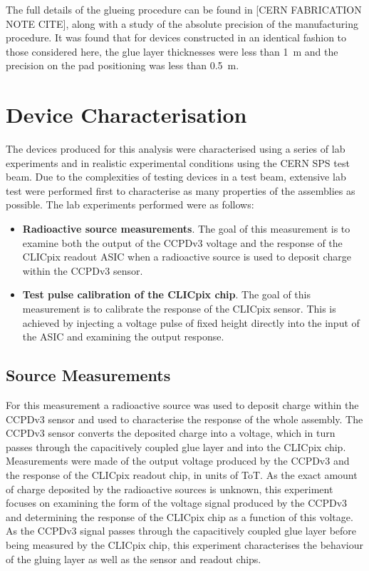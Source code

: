 The full details of the glueing procedure can be found in [CERN FABRICATION NOTE CITE], along with a study of the absolute precision of the manufacturing procedure.  It was found that for devices constructed in an identical fashion to those considered here, the glue layer thicknesses were less than 1~{\mu}m and the precision on the pad positioning was less than 0.5~{\mu}m.  


\section{Device Characterisation}
The devices produced for this analysis were characterised using a series of lab experiments and in realistic experimental conditions using the CERN SPS test beam.  Due to the complexities of testing devices in a test beam, extensive lab test were performed first to characterise as many properties of the assemblies as possible.  The lab experiments performed were as follows:

\begin{itemize}
\item \textbf{Radioactive source measurements}.  The goal of this measurement is to examine both the output of the CCPDv3 voltage and the response of the CLICpix readout ASIC when a radioactive source is used to deposit charge within the CCPDv3 sensor.  
\item \textbf{Test pulse calibration of the CLICpix chip}.  The goal of this measurement is to calibrate the response of the CLICpix sensor.  This is achieved by injecting a voltage pulse of fixed height directly into the input of the ASIC and examining the output response.  
\end{itemize} 


\subsection{Source Measurements}
For this measurement a radioactive source was used to deposit charge within the CCPDv3 sensor and used to characterise the response of the whole assembly.  The CCPDv3 sensor converts the deposited charge into a voltage, which in turn passes through the capacitively coupled glue layer and into the CLICpix chip.  Measurements were made of the output voltage produced by the CCPDv3 and the response of the CLICpix readout chip, in units of ToT.  As the exact amount of charge deposited by the radioactive sources is unknown, this experiment focuses on examining the form of the voltage signal produced by the CCPDv3 and determining the response of the CLICpix chip as a function of this voltage.  As the CCPDv3 signal passes through the capacitively coupled glue layer before being measured by the CLICpix chip, this experiment characterises the behaviour of the gluing layer as well as the sensor and readout chips.


